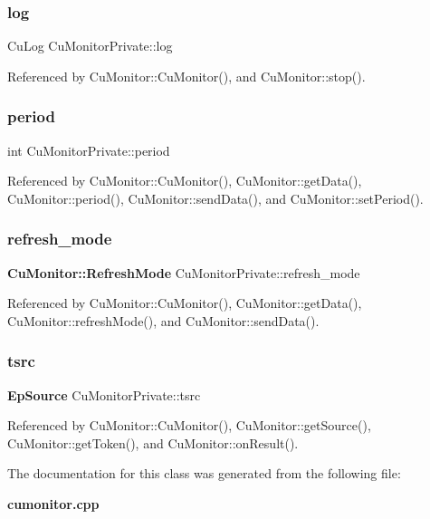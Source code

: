 \mbox{\label{classCuMonitorPrivate_a655f97ece1a8399381618a2b66c6ce0b}} 
\subsubsection{log}
{\footnotesize\ttfamily Cu\+Log Cu\+Monitor\+Private\+::log}



Referenced by Cu\+Monitor\+::\+Cu\+Monitor(), and Cu\+Monitor\+::stop().

\mbox{\label{classCuMonitorPrivate_aed81d4c836ac777391117449646d12c7}} 
\subsubsection{period}
{\footnotesize\ttfamily int Cu\+Monitor\+Private\+::period}



Referenced by Cu\+Monitor\+::\+Cu\+Monitor(), Cu\+Monitor\+::get\+Data(), Cu\+Monitor\+::period(), Cu\+Monitor\+::send\+Data(), and Cu\+Monitor\+::set\+Period().

\mbox{\label{classCuMonitorPrivate_a42138e7a75d47eb39cf4560d76d90c91}} 
\subsubsection{refresh\+\_\+mode}
{\footnotesize\ttfamily \textbf{ Cu\+Monitor\+::\+Refresh\+Mode} Cu\+Monitor\+Private\+::refresh\+\_\+mode}



Referenced by Cu\+Monitor\+::\+Cu\+Monitor(), Cu\+Monitor\+::get\+Data(), Cu\+Monitor\+::refresh\+Mode(), and Cu\+Monitor\+::send\+Data().

\mbox{\label{classCuMonitorPrivate_a2a10c4044b8f1678b92e53b5d139c2d6}} 
\subsubsection{tsrc}
{\footnotesize\ttfamily \textbf{ Ep\+Source} Cu\+Monitor\+Private\+::tsrc}



Referenced by Cu\+Monitor\+::\+Cu\+Monitor(), Cu\+Monitor\+::get\+Source(), Cu\+Monitor\+::get\+Token(), and Cu\+Monitor\+::on\+Result().



The documentation for this class was generated from the following file\+:\begin{DoxyCompactItemize}
\item 
\textbf{ cumonitor.\+cpp}\end{DoxyCompactItemize}
